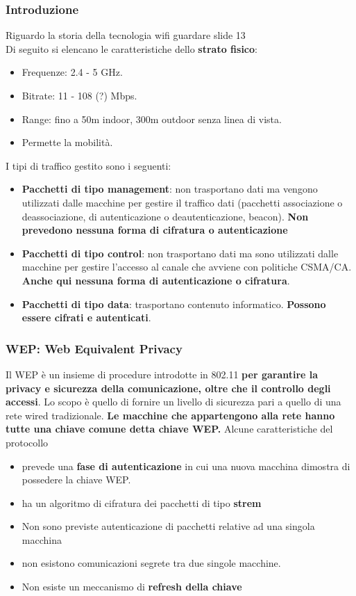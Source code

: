 \documentclass[12pt]{article}
\begin{document}
			\subsubsection{Introduzione}
				Riguardo la storia della tecnologia wifi  guardare slide 13\\
				Di seguito si elencano le caratteristiche dello \textbf{strato fisico}:
				\begin{itemize}
					\item Frequenze: 2.4 - 5 GHz.
					\item Bitrate: 11 - 108 (?) Mbps.
					\item Range: fino a 50m indoor, 300m outdoor senza linea di
					vista.
					\item Permette la mobilità.
				\end{itemize}
				I tipi di traffico gestito sono i seguenti:
				\begin{itemize}
					\item \textbf{Pacchetti di tipo management}: non trasportano dati ma vengono utilizzati dalle macchine per gestire il traffico dati (pacchetti associazione o deassociazione, di autenticazione o deautenticazione, beacon). \textbf{Non prevedono nessuna forma di cifratura o autenticazione}
					\item \textbf{Pacchetti di tipo control}: non trasportano dati ma sono utilizzati dalle macchine per gestire l'accesso al canale che avviene con politiche CSMA/CA. \textbf{Anche qui nessuna forma di autenticazione o cifratura}.
					\item \textbf{Pacchetti di tipo data}: trasportano contenuto informatico. \textbf{Possono essere cifrati e autenticati}.
				\end{itemize}
			\subsubsection{WEP: Web Equivalent Privacy}
				Il WEP è un insieme di procedure introdotte in 802.11 \textbf{per garantire la privacy e sicurezza della comunicazione, oltre che il controllo degli accessi}. Lo scopo è quello di fornire un livello di sicurezza pari a quello di una rete wired tradizionale. \textbf{Le macchine che appartengono alla rete hanno tutte una chiave comune detta chiave WEP.} Alcune caratteristiche del protocollo
				\begin{itemize}
					\item  prevede una \textbf{fase di autenticazione} in cui una nuova macchina dimostra di possedere la chiave WEP.
					\item ha un algoritmo di cifratura dei pacchetti di tipo \textbf{strem}
					\item Non sono previste autenticazione di pacchetti relative ad una singola macchina
					\item non esistono comunicazioni segrete tra due singole macchine.
					\item  Non esiste un meccanismo di \textbf{refresh della chiave}
				\end{itemize}
\end{document}
